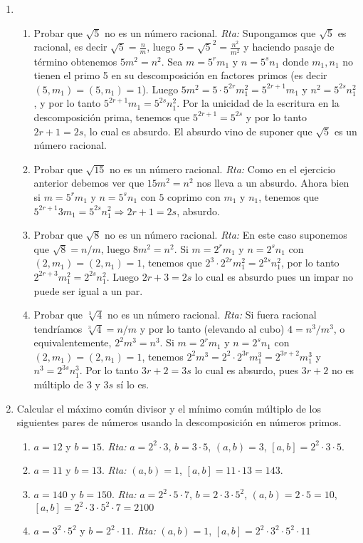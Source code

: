 \documentclass[12pt,spanish,makeidx]{amsbook}
\newcommand{\rta}{\noindent\textit{Rta: }}
\begin{document}
\begin{enumerate}
 
 \smallskip
 
 \item 
 \begin{enumerate}
 	\item Probar  que $\sqrt{5}$ no es un número racional. 	\rta Supongamos que  $\sqrt{5}$ es racional, es decir $\sqrt{5} = \displaystyle \frac{n}{m}$, luego $5 =\sqrt{5}^2 =\displaystyle \frac{n^2}{m^2}$ y haciendo pasaje de término obtenemos $5m^2 = n^2$. Sea $m = 5^rm_1$ y $n = 5^sn_1$ donde $m_1,n_1$ no tienen el primo 5 en su descomposición en factores primos (es decir $(5,m_1) = (5,n_1) = 1$). Luego $5m^2 = 5 \cdot 5^{2r}m_1^2= 5^{2r+1}m_1$ y $n^2 = 5^{2s}n_1^2$, y por lo tanto $5^{2r+1}m_1 =   5^{2s}n_1^2$. Por la unicidad de la escritura en la descomposición prima,  tenemos que  $5^{2r+1}= 5^{2s}$ y por lo tanto  ${2r+1}= {2s}$, lo cual es absurdo. El absurdo vino de suponer que   $\sqrt{5}$ es un número racional.
 	\item Probar  que $\sqrt{15}$ no es un número racional.  	\rta Como en el ejercicio anterior debemos ver que $15m^2 = n^2$ nos lleva a un absurdo. Ahora bien si $m = 5^rm_1$ y $n = 5^sn_1$ con $5$ coprimo con $m_1$ y $n_1$, tenemos que  $5^{2r+1}3m_1 =   5^{2s}n_1^2 \Rightarrow 2r+1 = 2s$, absurdo.
 	\item Probar  que $\sqrt{8}$ no es un número racional. 	\rta En  este caso  suponemos que $\sqrt{8} =n/m$, luego $ 8m^2 = n^2$. Si $m = 2^rm_1$ y $n = 2^sn_1$ con $(2,m_1) = (2,n_1) = 1$, tenemos  que $2^3 \cdot 2^{2r} m_1^2 = 2^{2s}n_1^2$, por lo tanto $2^{2r+3} m_1^2 = 2^{2s}n_1^2$. Luego $2r+3 = 2s$ lo cual es absurdo pues un impar no puede ser igual a un par.  
 	\item Probar  que $\sqrt[3]{4}$ no es un número racional. 	\rta Si fuera racional tendríamos $\sqrt[3]{4} = n/m$ y  por lo tanto (elevando al cubo) $4 =n^3/m^3$, o equivalentemente,   $2^2m^3 = n^3$. Si $m = 2^rm_1$ y $n = 2^sn_1$ con $(2,m_1) = (2,n_1) = 1$, tenemos  $2^2m^3 = 2^2\cdot 2^{3r}m_1^3 =2^{3r+2}m_1^3$ y  	$n^3 =2^{3s}n_1^3 $. Por  lo tanto  $3r+2 = 3s$ lo cual es absurdo, pues $3r+2$ no es múltiplo de 3 y $3s$ sí lo es.
 \end{enumerate}
\smallskip


\item Calcular el máximo común divisor y el mínimo común múltiplo de los siguientes pares de números usando la descomposición en números primos. 
\begin{enumerate}
	\item 
	$a = 12$ y $b = 15$.  \rta $a = 2^2 \cdot 3$, $b = 3 \cdot 5$, $(a,b)=3$, $[a,b]=2^2 \cdot 3 \cdot 5$.
	\item 
	$a = 11$ y $b = 13$.  \rta $(a,b)=1$, $[a,b]=11 \cdot 13 =143$.
	\item 
	$a = 140$ y $b = 150$.  \rta $a = 2^2 \cdot 5 \cdot 7$, $b = 2 \cdot 3 \cdot 5^2$,  $(a,b)= 2 \cdot 5 = 10$, $[a,b]=2^2  \cdot 3\cdot 5^2  \cdot 7=2100$
	\item 
	$a = 3^2\cdot5^2$  y $b = 2^2\cdot11$.  \rta  $(a,b)=1$, $[a,b]= 2^2\cdot3^2\cdot5^2\cdot11$ 
	

\end{enumerate}
\end{enumerate}
\end{document}
